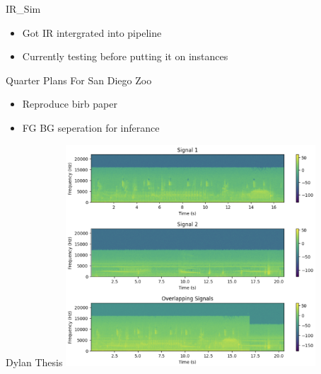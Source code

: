\begin{frame}{IR_Sim}
    \begin{itemize}
        \item Got IR intergrated into pipeline
        \item Currently testing before putting it on instances
    \end{itemize}
\end{frame}

\begin{frame}{Quarter Plans For San Diego Zoo}
    \begin{itemize}
        \item Reproduce birb paper
        \item FG BG seperation for inferance
    \end{itemize}
\end{frame}

\begin{frame}{Dylan Thesis}
    \centering
    \includegraphics[height=0.7\textheight,width=0.7\textwidth,keepaspectratio]{dylan-aid-1-24.png}
\end{frame}







